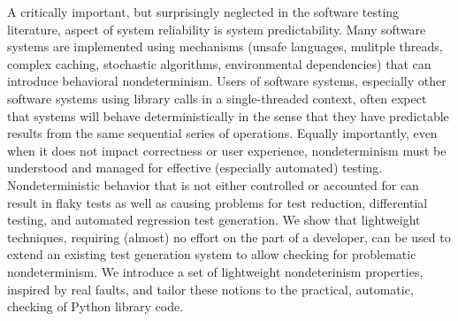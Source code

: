 A critically important, but surprisingly neglected in the software testing literature, aspect of system reliability is system predictability.  Many software systems are implemented using mechanisms (unsafe languages, mulitple threads, complex caching, stochastic algorithms, environmental dependencies) that can introduce behavioral nondeterminism.  Users of software systems, especially other software systems using library calls in a single-threaded context, often expect that systems will behave deterministically in the sense that they have predictable results from the same sequential series of operations.  Equally importantly, even when it does not impact correctness or user experience, nondeterminism must be understood and managed for effective (especially automated) testing.  Nondeterministic behavior that is not either controlled or accounted for can result in flaky tests as well as causing problems for test reduction, differential testing, and automated regression test generation.  We show that lightweight techniques, requiring (almost) no effort on the part of a developer, can be used to extend an existing test generation system to allow checking for problematic nondeterminism.  We introduce a set of lightweight nondeterinism properties, inspired by real faults, and tailor these notions to the practical, automatic, checking of Python library code.